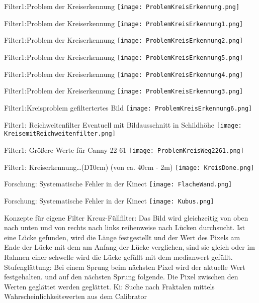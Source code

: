 \documentclass{VLKlauck}
\begin{document}
\begin{frame}{Filter1:Problem der Kreiserkennung}
	\texttt{[image: ProblemKreisErkennung.png]}
\end {frame}
\begin{frame}{Filter1:Problem der Kreiserkennung}
	\texttt{[image: ProblemKreisErkennung1.png]}
\end {frame}
\begin{frame}{Filter1:Problem der Kreiserkennung}
	\texttt{[image: ProblemKreisErkennung2.png]}
\end {frame}
\begin{frame}{Filter1:Problem der Kreiserkennung}
	\texttt{[image: ProblemKreisErkennung5.png]}
\end {frame}
\begin{frame}{Filter1:Problem der Kreiserkennung}
	\texttt{[image: ProblemKreisErkennung4.png]}
\end {frame}
\begin{frame}{Filter1:Problem der Kreiserkennung}
	\texttt{[image: ProblemKreisErkennung3.png]}
\end {frame}
\begin{frame}{Filter1:Kreisproblem gefiltertertes Bild}
	\texttt{[image: ProblemKreisErkennung6.png]}
\end {frame}
\begin{frame}{Filter1: Reichweitenfilter}
	Eventuell mit Bildausschnitt in Schildhöhe
	\texttt{[image: KreisemitReichweitenfilter.png]}
\end {frame}
\begin{frame}{Filter1: Größere Werte für Canny 22 61}
	\texttt{[image: ProblemKreisWeg2261.png]}
\end {frame}
\begin{frame}{Filter1: Kreiserkennung\ldots (D\=10cm) (von ca. 40cm - 2m)}
	\texttt{[image: KreisDone.png]}
\end {frame}
\begin{frame}{Forschung: Systematische Fehler in der Kinect}
	\texttt{[image: FlacheWand.png]}
\end {frame}
\begin{frame}{Forschung: Systematische Fehler in der Kinect}
	\texttt{[image: Kubus.png]}
\end {frame}
\begin{frame}{Konzepte für eigene Filter}
	Kreuz-Füllfilter:
		Das Bild wird gleichzeitig von oben nach unten und von rechts nach links
		reihenweise nach Lücken durchsucht.
		Ist eine Lücke gefunden, wird die Länge festgestellt und der Wert des Pixels
		am Ende der Lücke mit dem am Anfang der Lücke verglichen, sind sie gleich 
		oder im Rahmen einer schwelle wird die Lücke gefüllt mit dem medianwert
		gefüllt.
	Stufenglättung:
		Bei einem Sprung beim nächsten Pixel wird der aktuelle Wert festgehalten.
		und auf den nächsten Sprung folgende. Die Pixel zwischen den Werten geglättet
		werden geglättet.
	Ki: Suche nach Fraktalen mittels Wahrscheinlichkeitswerten aus dem Calibrator
\end {frame}
\end{document}
